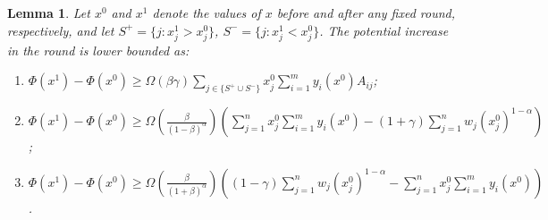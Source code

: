 \documentclass[11pt]{article}
\newtheorem{lemma}[theorem]{Lemma}
\begin{document}
\begin{lemma}\label{lemma:potential-increase-alpha>1}
Let $x^0$ and $x^1$ denote the values of $x$ before and after any fixed round, respectively, and let $S^+ = \{j: x_j^1 > x_j^0\}$, $S^- = \{j: x_j^1 < x_j^0\}$. The potential increase in the round is lower bounded as:
\begin{enumerate}[noitemsep, topsep=5pt]
\item $\Phi(x^1) - \Phi(x^0) \geq \Omega(\beta\gamma)\sum_{j\in\{S^+\cup S^-\}} x_j^0\sum_{i=1}^m y_i(x^0)A_{ij}$;
\item $\Phi(x^1) - \Phi(x^0) \geq \Omega\left(\frac{\beta}{(1-\beta)^{\alpha}}\right) \left(\sum_{j=1}^n x_j^0 \sum_{i=1}^m y_i(x^0) - (1+\gamma) \sum_{j=1}^nw_j (x_j^0)^{1-\alpha}\right)$;
\item $\Phi(x^1) - \Phi(x^0) \geq \Omega\left(\frac{\beta}{(1+\beta)^{\alpha}}\right) \left( (1-\gamma)\sum_{j=1}^n w_j (x_j^0)^{1-\alpha} - \sum_{j=1}^n x_j^0 \sum_{i=1}^m y_i(x^0)\right)$.
\end{enumerate}
\end{lemma}
\end{document}
